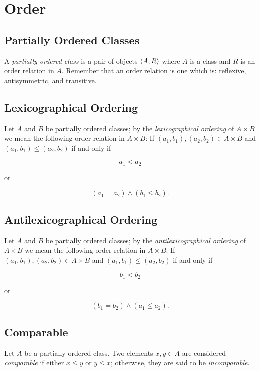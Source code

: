 \chapter{Order}

\section{Partially Ordered Classes}

A \emph{partially ordered class} is a pair of objects \(\left\langle A, R\right\rangle\) where \(A\) is a class and \(R\) is
an order relation in \(A\). Remember that an order relation is one which is: reflexive, antisymmetric, and transitive.

\section{Lexicographical Ordering}

Let \(A\) and \(B\) be partially ordered classes; by the \emph{lexicographical ordering} of \(A \times B\) we
mean the following order relation in \(A \times B\): If \((a_1, b_1), (a_2, b_2) \in A \times B\) and \((a_1, b_1) \le (a_2, b_2) \)
if and only if

\[
	a_1 < a_2
\]

or

\[
	(a_1 = a_2) \land (b_1 \le b_2).
\]

\section{Antilexicographical Ordering}

Let \(A\) and \(B\) be partially ordered classes; by the \emph{antilexicographical ordering} of \(A \times B\) we
mean the following order relation in \(A \times B\): If \((a_1, b_1), (a_2, b_2) \in A \times B\) and \((a_1, b_1) \le (a_2, b_2) \)
if and only if

\[
	b_1 < b_2
\]

or

\[
	(b_1 = b_2) \land (a_1 \le a_2).
\]

\section{Comparable}

Let \(A\) be a partially ordered class. Two elements \(x, y \in A\) are considered \emph{comparable} if
either \(x \le y\) or \(y \le x\); otherwise, they are said to be \emph{incomparable}.

